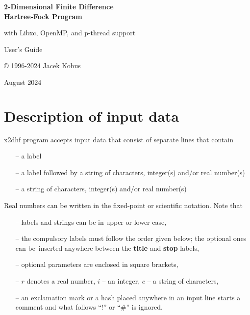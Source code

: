 \documentclass[10pt,a4paper]{article}
\newcommand{\clearemptydoublepage}{\newpage{\pagestyle{empty}\cleardoublepage}}
\begin{document}
\thispagestyle{empty}

\vspace*{4cm}
\begin{center}

{\LARGE\bf 2-Dimensional Finite Difference \\[10pt]
Hartree-Fock Program}

\vskip 0.5cm

{\large with Libxc, OpenMP, and p-thread support }

\vskip 1.0cm

{\Large User's Guide}

\vskip 1.0cm

{\large  © 1996-2024 Jacek Kobus \\[10pt]}

{ August 2024\\[10pt]}

\end{center}

\clearemptydoublepage
\tableofcontents
\thispagestyle{empty}
\clearemptydoublepage
\section{Description of input data}

x2dhf program accepts input data that consist of separate lines that contain
\begin{itemize}
\item[--] a label
\item[--] a label followed by a string of characters, integer(s)
  and/or real number(s)
\item[--] a string of characters, integer(s) and/or real number(s)
\end{itemize}
Real numbers can be written in the fixed-point or scientific notation.
\noindent
Note that
\begin{itemize}
\item[--] labels and strings can be in upper or lower case,

\item[--] the compulsory labels must follow the order given below; the
  optional ones can be~inserted anywhere between the \textbf{title}
  and \textbf{stop} labels,

\item[--] optional parameters are enclosed in square brackets,

\item[--] $r$ denotes a real number, $i$ -- an integer, $c$ -- a string
          of characters,

\item[--] an exclamation mark or a hash placed anywhere in an input
  line starts a comment and what follows ``!'' or ``\#'' is ignored.

\end{itemize}
\end{document}
